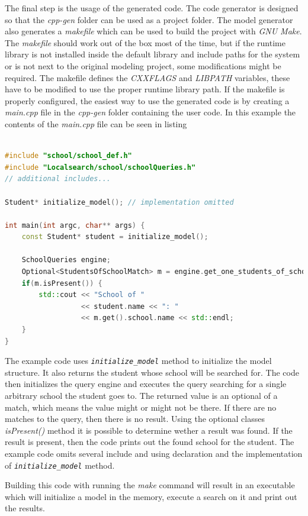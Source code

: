 The final step is the usage of the generated code. The code generator is
designed so that the \emph{cpp-gen} folder can be used as a project folder. The
model generator also generates a \emph{makefile} which can be used to build the
project with \emph{GNU Make}. The \emph{makefile} should work out of the box
most of the time, but if the runtime library is not installed inside the default
library and include paths for the system or is not next to the original modeling
project, some modifications might be required. The makefile defines the
\emph{CXXFLAGS} and \emph{LIBPATH} variables, these have to be modified to use
the proper runtime library path. If the makefile is properly configured, the
easiest way to use the generated code is by creating a \emph{main.cpp} file in
the \emph{cpp-gen} folder containing the user code. In this example the contents
of the \emph{main.cpp} file can be seen in listing 

\begin{lstlisting}[frame=single,float=!ht,language=C++,
label=listing:example_school_cpp, caption=Fragment of the \emph{main.cpp}
file for the example project]

#include "school/school_def.h"
#include "Localsearch/school/schoolQueries.h"
// additional includes...

Student* initialize_model(); // implementation omitted

int main(int argc, char** args) {
	const Student* student = initialize_model();
	
	SchoolQueries engine;
	Optional<StudentsOfSchoolMatch> m = engine.get_one_students_of_school(student); 
	if(m.isPresent()) { 
		std::cout << "School of " 
				  << student.name << ": " 
				  << m.get().school.name <<	std::endl; 
	}
}
\end{lstlisting}

The example code uses \emph{\texttt{initialize\_model}} method to initialize the
model structure. It also returns the student whose school will be searched for.
The code then initializes the query engine and executes the query searching for
a single arbitrary school the student goes to. The returned value is an optional
of a match, which means the value might or might not be there. If there are no
matches to the query, then there is no result. Using the optional classes
\emph{isPresent()} method it is possible to determine wether a result was found.
If the result is present, then the code prints out the found school for the
student. The example code omits several include and using declaration and the
implementation of \emph{\texttt{initialize\_model}} method.

Building this code with running the \emph{make} command will result in an
executable which will initialize a model in the memory, execute a search on it
and print out the results.

